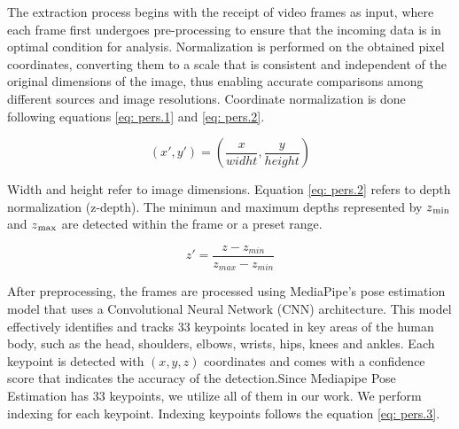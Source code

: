 The extraction process begins with the receipt of video frames as input, where each frame first undergoes pre-processing to ensure that the incoming data is in optimal condition for analysis. Normalization is performed on the obtained pixel coordinates, converting them to a scale that is consistent and independent of the original dimensions of the image, thus enabling accurate comparisons among different sources and image resolutions. Coordinate normalization is done following equations \eqref{eq: pers.1} and \eqref{eq: pers.2}.

\begin{equation}\label{eq: pers.1}
	(x',y') = \left(\frac{x}{widht},\frac{y}{height}\right)
\end{equation}

Width and height refer to image dimensions. Equation \eqref{eq: pers.2} refers to depth normalization (z-depth). The minimun and maximum depths represented by \(z\textsubscript{min}\) and \(z\textsubscript{max}\) are detected within the frame or a preset range.

\begin{equation}\label{eq: pers.2}
	z' = \frac{z-z_{min}}{z_{max}-z_{min}}
\end{equation}

After preprocessing, the frames are processed using MediaPipe's pose estimation model that uses a Convolutional Neural Network (CNN) architecture. This model effectively identifies and tracks 33 keypoints located in key areas of the human body, such as the head, shoulders, elbows, wrists, hips, knees and ankles. Each keypoint is detected with \((x, y, z)\) coordinates and comes with a confidence score that indicates the accuracy of the detection.Since Mediapipe Pose Estimation has 33 keypoints, we utilize all of them in our work. We perform indexing for each keypoint. Indexing keypoints follows the equation \ref{eq: pers.3}.

